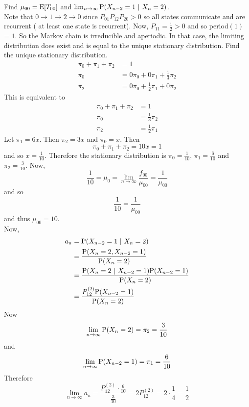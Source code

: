 \documentclass[12pt]{article}
\begin{document}
Find $\mu_{00} = \mathrm{E}[ T_{00} ]$ and $\lim_{n\to\infty} \mathrm{P}( X_{n-2} = 1 ~|~ X_n = 2 )$. \\
Note that $0\to1\to2\to0$ since $P_{01}P_{12}P_{20} > 0$ so all states communicate and are recurrent ( at least one state is recurrent). Now, $P_{11} = \frac{1}{2} > 0$ and so period$(1)$ = $1$. So the Markov chain is irreducible and aperiodic. In that case, the limiting distribution does exist and is equal to the unique stationary distribution. Find the unique stationary distribution. $$ \begin{aligned} \pi_0 + \pi_1 + \pi_2 &= 1 \\ \pi_0 &= 0\pi_0 + 0\pi_1 + \frac{1}{3}\pi_2 \\ \pi_2 &= 0\pi_0 + \frac{1}{2}\pi_1 + 0\pi_2 \end{aligned} $$ This is equivalent to $$ \begin{aligned} \pi_0 + \pi_1 + \pi_2 &= 1 \\ \pi_0 &= \frac{1}{3}\pi_2 \\ \pi_2 &= \frac{1}{2}\pi_1 \end{aligned} $$ Let $\pi_1 = 6x$. Then $\pi_2 = 3x$ and $\pi_0 = x$. Then $$ \pi_0 + \pi_1 + \pi_2 = 10x = 1 $$ and so $x = \frac{1}{10}$. Therefore the stationary distribution is $\pi_0 = \frac{1}{10}$, $\pi_1 = \frac{6}{10}$ and $\pi_2 = \frac{3}{10}$. Now, $$ \frac{1}{10} = \mu_0 = \lim_{n\to\infty} \frac{f_{00}}{\mu_{00}} = \frac{1}{\mu_{00}} $$ and so $$ \frac{1}{10} = \frac{1}{\mu_{00}}$$ and thus $\mu_{00} = 10$. \\ Now,  $$ \begin{aligned} a_n &= \mathrm{P}( X_{n-2} = 1 ~|~ X_n = 2 ) \\ &= \frac{\mathrm{P}( X_n = 2, X_{n-2} = 1 )}{\mathrm{P}( X_n = 2 )} \\ &= \frac{\mathrm{P}( X_n = 2 ~|~ X_{n-2} = 1 ) \mathrm{P}( X_{n-2} = 1 )}{\mathrm{P}( X_n=2 )} \\ &= \frac{P_{12}^{(2)} \mathrm{P}( X_{n-2} = 1 )}{\mathrm{P}( X_n = 2 )} \end{aligned} $$ Now $$ \lim_{n\to\infty} \mathrm{P}( X_n=2 ) = \pi_2 = \frac{3}{10} $$ and $$ \lim_{n\to\infty} \mathrm{P}( X_{n-2} = 1 ) = \pi_1 = \frac{6}{10} $$ Therefore $$ \lim_{n\to\infty} a_n = \frac{P_{12}^{(2)} \cdot \frac{6}{10}}{\frac{3}{10}} = 2P_{12}^{(2)} = 2 \cdot \frac{1}{4} = \frac{1}{2} $$ 
\end{document}

